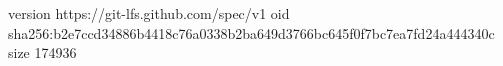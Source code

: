 version https://git-lfs.github.com/spec/v1
oid sha256:b2e7ccd34886b4418c76a0338b2ba649d3766bc645f0f7bc7ea7fd24a444340c
size 174936

